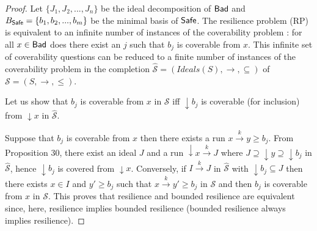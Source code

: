 \begin{proof}
Let $\{J_1, J_2,...,J_n\}$ be the ideal decomposition of $\textsf{Bad}$ and $B_{\textsf{Safe}}=\{b_1,b_2,...,b_m\}$ be the minimal basis of $\textsf{Safe}$.
The %
resilience problem (RP) is equivalent to an infinite number of instances of the coverability problem : for all $x \in \textsf{Bad}$ does there exist an $j$ such that $b_j$ is coverable from $x$. This infinite set of coverability questions can be reduced to a finite number of instances of the coverability problem in the completion $\hat{\mathscr{S}}=(Ideals(S),\rightarrow, \subseteq)$ of $\mathscr{S}=(S,\rightarrow, \leq)$.


Let us show that $b_j$ is coverable from $x$ in $\mathscr{S}$ iff $\downarrow b_j$ is coverable (for inclusion) from $\downarrow x$ in $\hat{\mathscr{S}}$.

Suppose that $b_j$ is coverable from $x$ then there exists a run $x \xrightarrow{k} y \geq b_j$. From Proposition 30, there exist an ideal $J$ and a run $\downarrow x \xrightarrow{k} J$ where $J \supseteq \downarrow y \supseteq \downarrow b_j$ in $\hat{\mathscr{S}}$, hence $\downarrow b_j$ is covered from $\downarrow x$.
Conversely, if $I \xrightarrow{k} J$ in $\hat{\mathscr{S}}$ with $\downarrow b_j \subseteq J$ then 
there exists $x \in I$ and $y' \geq b_j$ such that $x \xrightarrow{k} y'  \geq b_j$ in $\mathscr{S}$ and then $b_j$ is coverable from $x$ in $\mathscr{S}$.
%
This proves that resilience and bounded resilience are equivalent since, here, resilience implies bounded resilience (bounded resilience always implies resilience).
%


\end{proof}
